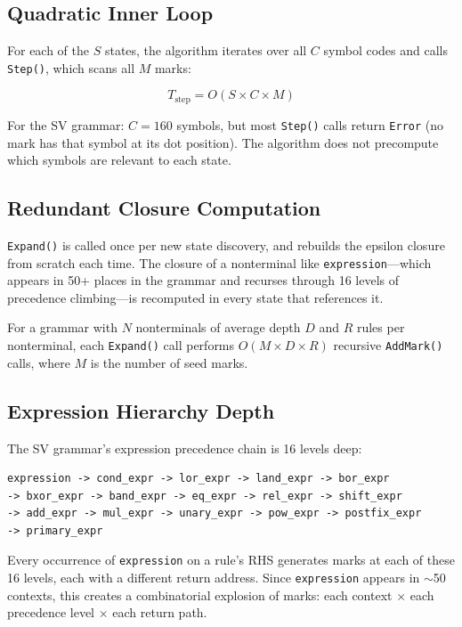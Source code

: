 \documentclass[11pt]{article}
\begin{document}
\subsection{Quadratic Inner Loop}

For each of the $S$ states, the algorithm iterates over all $C$
symbol codes and calls \texttt{Step()}, which scans all $M$ marks:

\[
T_{\text{step}} = O(S \times C \times M)
\]

For the SV grammar: $C = 160$ symbols, but most \texttt{Step()} calls
return \texttt{Error} (no mark has that symbol at its dot position).
The algorithm does not precompute which symbols are relevant to each
state.

\subsection{Redundant Closure Computation}

\texttt{Expand()} is called once per new state discovery, and
rebuilds the epsilon closure from scratch each time.  The closure of a
nonterminal like \texttt{expression}---which appears in 50+ places in
the grammar and recurses through 16 levels of precedence
climbing---is recomputed in every state that references it.

For a grammar with $N$ nonterminals of average depth $D$ and $R$ rules
per nonterminal, each \texttt{Expand()} call performs
$O(M \times D \times R)$ recursive \texttt{AddMark()} calls, where $M$
is the number of seed marks.

\subsection{Expression Hierarchy Depth}

The SV grammar's expression precedence chain is 16 levels deep:

\begin{lstlisting}[language={},basicstyle=\ttfamily\footnotesize]
expression -> cond_expr -> lor_expr -> land_expr -> bor_expr
-> bxor_expr -> band_expr -> eq_expr -> rel_expr -> shift_expr
-> add_expr -> mul_expr -> unary_expr -> pow_expr -> postfix_expr
-> primary_expr
\end{lstlisting}

Every occurrence of \texttt{expression} on a rule's RHS generates
marks at each of these 16 levels, each with a different return
address.  Since \texttt{expression} appears in $\sim$50 contexts, this
creates a combinatorial explosion of marks: each context $\times$ each
precedence level $\times$ each return path.
\end{document}
